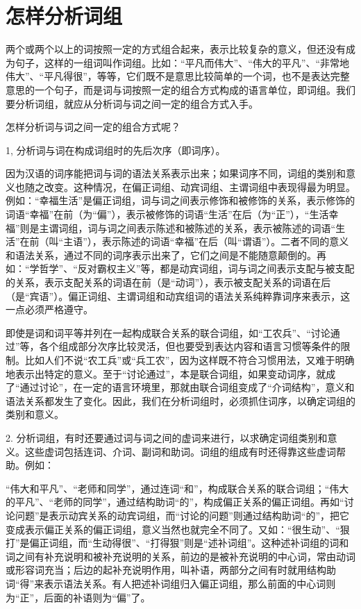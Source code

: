 \section{怎样分析词组}

两个或两个以上的词按照一定的方式组合起来，表示比较复杂的意义，但还没有成为句子，这样的一组词叫作词组。比如：“平凡而伟大”、“伟大的平凡”、“非常地伟大”、“平凡得很”，等等，它们既不是意思比较简单的一个词，也不是表达完整意思的一个句子，而是词与词按照一定的组合方式构成的语言单位，即词组。我们要分析词组，就应从分析词与词之间一定的组合方式入手。

怎样分析词与词之间一定的组合方式呢？

1, 分析词与词在构成词组时的先后次序（即词序）。

因为汉语的词序能把词与词的语法关系表示出来；如果词序不同，词组的类别和意义也随之改变。这种情况，在偏正词组、动宾词组、主谓词组中表现得最为明显。例如：“幸福生活”是偏正词组，词与词之间表示修饰和被修饰的关系，表示修饰的词语“幸福”在前（为“偏”），表示被修饰的词语“生活”在后（为“正”），“生活幸福”则是主谓词组，词与词之间表示陈述和被陈述的关系，表示被陈述的词语“生活”在前（叫“主语”），表示陈述的词语“幸福”在后（叫“谓语”）。二者不同的意义和语法关系，通过不同的词序表示出来了，它们之间是不能随意颠倒的。再如：“学哲学”、“反对霸权主义”等，都是动宾词组，词与词之间表示支配与被支配的关系，表示支配关系的词语在前（是“动词”），表示被支配关系的词语在后（是“宾语”）。偏正词组、主谓词组和动宾组词的语法关系纯粹靠词序来表示，这一点必须严格遵守。

即使是词和词平等并列在一起构成联合关系的联合词组，如“工农兵”、“讨论通过”等，各个组成部分次序比较灵活，但也要受到表达内容和语言习惯等条件的限制。比如人们不说“农工兵”或“兵工农”，因为这样既不符合习惯用法，又难于明确地表示出特定的意义。至于“讨论通过”，本是联合词组，如果变动词序，就成了“通过讨论”，在一定的语言环境里，那就由联合词组变成了“介词结构”，意义和语法关系都发生了变化。因此，我们在分析词组时，必须抓住词序，以确定词组的类别和意义。

2. 分析词组，有时还要通过词与词之间的虚词来进行，以求确定词组类别和意义。这些虚词包括连词、介词、副词和助词。词组的组成有时还得靠这些虚词帮助。例如：

“伟大和平凡”、“老师和同学”，通过连词“和”，构成联合关系的联合词组；“伟大的平凡”、“老师的同学”，通过结构助词“的”，构成偏正关系的偏正词组。再如“讨论问题”是表示动宾关系的动宾词组，而“讨论的问题”则通过结构助词“的”，把它变成表示偏正关系的偏正词组，意义当然也就完全不同了。又如：“很生动”、“狠打”是偏正词组，而“生动得很”、“打得狠”则是“述补词组”。这种述补词组的词和词之间有补充说明和被补充说明的关系，前边的是被补充说明的中心词，常由动词或形容词充当；后边的起补充说明作用，叫补语，两部分之间有时就用结构助词“得”来表示语法关系。有人把述补词组归入偏正词组，那么前面的中心词则为“正”，后面的补语则为“偏”了。

